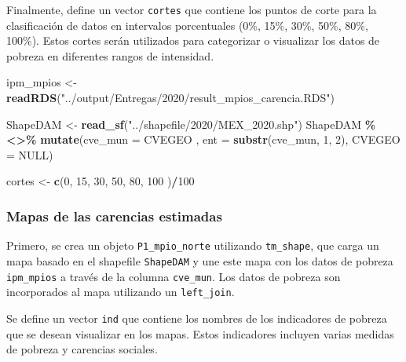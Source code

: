 \documentclass[
  12pt,
]{book}
\newenvironment{Shaded}{\begin{snugshade}}{\end{snugshade}}
\newcommand{\AttributeTok}[1]{\textcolor[rgb]{0.13,0.29,0.53}{#1}}
\newcommand{\ConstantTok}[1]{\textcolor[rgb]{0.56,0.35,0.01}{#1}}
\newcommand{\DecValTok}[1]{\textcolor[rgb]{0.00,0.00,0.81}{#1}}
\newcommand{\FunctionTok}[1]{\textcolor[rgb]{0.13,0.29,0.53}{\textbf{#1}}}
\newcommand{\NormalTok}[1]{#1}
\newcommand{\OtherTok}[1]{\textcolor[rgb]{0.56,0.35,0.01}{#1}}
\newcommand{\SpecialCharTok}[1]{\textcolor[rgb]{0.81,0.36,0.00}{\textbf{#1}}}
\newcommand{\StringTok}[1]{\textcolor[rgb]{0.31,0.60,0.02}{#1}}
\begin{document}
Finalmente, define un vector \texttt{cortes} que contiene los puntos de corte para la clasificación de datos en intervalos porcentuales (0\%, 15\%, 30\%, 50\%, 80\%, 100\%). Estos cortes serán utilizados para categorizar o visualizar los datos de pobreza en diferentes rangos de intensidad.

\begin{Shaded}
\begin{Highlighting}[]
\NormalTok{ipm\_mpios }\OtherTok{\textless{}{-}} 
  \FunctionTok{readRDS}\NormalTok{(}\StringTok{"../output/Entregas/2020/result\_mpios\_carencia.RDS"}\NormalTok{)   }

\NormalTok{ShapeDAM }\OtherTok{\textless{}{-}} \FunctionTok{read\_sf}\NormalTok{(}\StringTok{"../shapefile/2020/MEX\_2020.shp"}\NormalTok{)}
\NormalTok{ShapeDAM }\SpecialCharTok{\%\textless{}\textgreater{}\%} \FunctionTok{mutate}\NormalTok{(}\AttributeTok{cve\_mun =}\NormalTok{ CVEGEO ,}
                     \AttributeTok{ent =} \FunctionTok{substr}\NormalTok{(cve\_mun, }\DecValTok{1}\NormalTok{, }\DecValTok{2}\NormalTok{),}
                     \AttributeTok{CVEGEO =} \ConstantTok{NULL}\NormalTok{) }

\NormalTok{cortes }\OtherTok{\textless{}{-}} \FunctionTok{c}\NormalTok{(}\DecValTok{0}\NormalTok{,  }\DecValTok{15}\NormalTok{, }\DecValTok{30}\NormalTok{, }\DecValTok{50}\NormalTok{, }\DecValTok{80}\NormalTok{, }\DecValTok{100}\NormalTok{ )}\SpecialCharTok{/}\DecValTok{100}
\end{Highlighting}
\end{Shaded}

\hypertarget{mapas-de-las-carencias-estimadas}{%
\subsubsection*{Mapas de las carencias estimadas}\label{mapas-de-las-carencias-estimadas}}

Primero, se crea un objeto \texttt{P1\_mpio\_norte} utilizando \texttt{tm\_shape}, que carga un mapa basado en el shapefile \texttt{ShapeDAM} y une este mapa con los datos de pobreza \texttt{ipm\_mpios} a través de la columna \texttt{cve\_mun}. Los datos de pobreza son incorporados al mapa utilizando un \texttt{left\_join}.

Se define un vector \texttt{ind} que contiene los nombres de los indicadores de pobreza que se desean visualizar en los mapas. Estos indicadores incluyen varias medidas de pobreza y carencias sociales.
\end{document}
